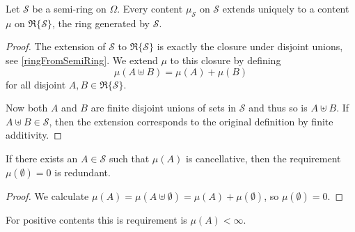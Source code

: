 \begin{lemma} \label{contentsOnSemiRingToRing}
Let $\mathcal{S}$ be a semi-ring on $\Omega$. Every content $\mu_\mathcal{S}$ on $\mathcal{S}$ extends uniquely to a content $\mu$ on $\mathfrak{R}\{\mathcal{S}\}$, the ring generated by $\mathcal{S}$.
\end{lemma}
\begin{proof}
The extension of $\mathcal{S}$ to $\mathfrak{R}\{\mathcal{S}\}$ is exactly the closure under disjoint unions, see \ref{ringFromSemiRing}. We extend $\mu$ to this closure by defining
\[ \mu(A\uplus B) = \mu(A) + \mu(B) \]
for all disjoint $A,B\in \mathfrak{R}\{\mathcal{S}\}$. 

Now both $A$ and $B$ are finite disjoint unions of sets in $\mathcal{S}$ and thus so is $A\uplus B$. If $A\uplus B \in \mathcal{S}$, then the extension corresponds to the original definition by finite additivity.
\end{proof}

\begin{lemma} \label{emptysetNullset}
If there exists an $A\in \mathcal{S}$ such that $\mu(A)$ is cancellative, then the requirement $\mu(\emptyset) = 0$ is redundant.
\end{lemma}
\begin{proof}
We calculate $\mu(A) = \mu(A \uplus \emptyset) = \mu(A) + \mu(\emptyset)$, so $\mu(\emptyset) = 0$.
\end{proof}
For positive contents this is requirement is $\mu(A) < \infty$.

